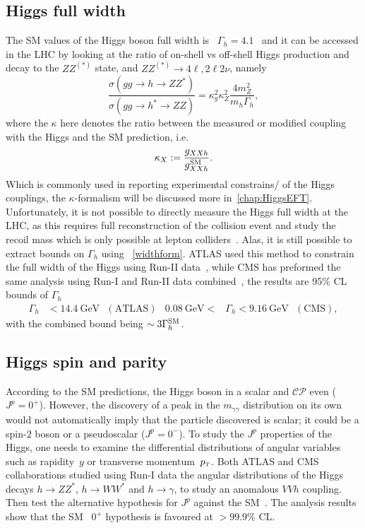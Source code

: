 \subsection{Higgs full width}
The SM values of the Higgs boson full width is ~$\Gamma_h=4.1$ \GeV\, and it can be accessed in the LHC by looking at the ratio of on-shell vs off-shell Higgs production and decay to the $ZZ^{(*)}$ state, and $ZZ^{(*)}\to 4 \ell, 2 \ell 2 \nu$, namely
\begin{equation}
	\frac{\sigma(gg \to h\to Z Z^*)}{\sigma(gg \to h^*\to Z Z)} = \kappa_g^2 \kappa_Z^2 \frac{4 m_Z^2}{m_h \Gamma_h},
	\label{widthform}
\end{equation}
where the $\kappa$ here denotes the ratio between the measured or modified coupling with the Higgs and the SM prediction, i.e.
\begin{equation}
	\kappa_X := \frac{g_{XX h}}{g_{XXh}^{\mathrm{SM}}}.
	\label{kappa}
\end{equation}
Which is commonly used in reporting experimental constrains/ of the Higgs couplings,  the $\kappa$-formalism will be discussed more in~\autoref{chap:HiggsEFT}. \\  Unfortunately, it is not possible to directly measure the Higgs full width at the LHC, as this requires full reconstruction of the collision event and study the recoil mass which is only possible at lepton colliders~\cite{DeBlas:2019qco,Banerjee:2021huv}. 
Alas, it is still possible to extract bounds on $\Gamma_h$ using ~\eqref{widthform}. ATLAS used this method to constrain the full width of the Higgs using Run-II data~\cite{ATLAS:2018jym}, while CMS has preformed the same analysis using Run-I and Run-II data combined~\cite{CMS:2019ekd}, the results are 95\% CL bounds of $\Gamma_h$
\begin{align}
	\Gamma_h &< \SI{14.4}{\giga\electronvolt} \,\,\,\, (\text{ATLAS}) & \SI{0.08}{\giga\electronvolt} <&\Gamma_h < \SI{9.16}{\giga\electronvolt}  \,\,\,\, (\text{CMS}),
\end{align}
with the combined bound being  $\sim 3 \Gamma_h^{\mathrm{SM}}$. 
\subsection{Higgs spin and parity \label{higgscp}}
According to the SM predictions, the Higgs boson in a scalar and $\mathcal{CP}$ even ($J^p= 0^+$). However, the discovery of a peak in the $m_{\gamma \gamma}$ distribution on its own would not automatically imply that the particle discovered is scalar; it could be a spin-$2$ boson or a pseudoscalar  ($J^p= 0^-$). To study the $J^p$ properties of the Higgs, one needs to examine the differential distributions of angular variables such as rapidity~$y$ or transverse momentum~$p_{\scriptscriptstyle T}$. Both ATLAS and CMS collaborations studied using Run-I data the angular distributions of the Higgs decays $ h \to ZZ^*$, $h \to W W^*$ and $ h \to \gamma$, to study an anomalous $VVh$ coupling. Then test the alternative hypothesis for $J^p$ against the SM~\cite{ATLAS:2015zhl, CMS:2014nkk}.  The analysis results show that the SM ~$0^+$ hypothesis is favoured at $ >99.9\%$ CL. 
